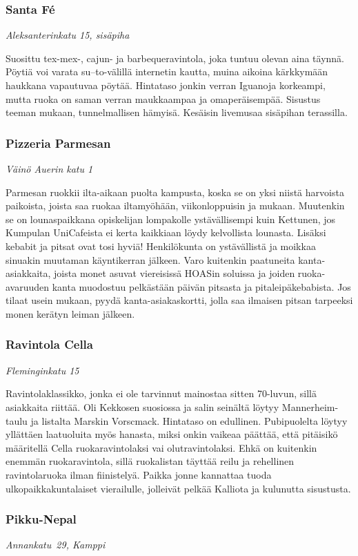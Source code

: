 \documentclass[../ala_hataile.tex]{subfiles}
\begin{document}
\subsubsection*{Santa Fé}
\textit{Aleksanterinkatu 15, sisäpiha}

Suosittu tex-mex-, cajun- ja barbequeravintola,
joka tuntuu olevan aina täynnä.
Pöytiä voi varata su--to-välillä internetin kautta, muina aikoina
kärkkymään haukkana vapautuvaa
pöytää. Hintataso jonkin verran Iguanoja
korkeampi, mutta ruoka on saman verran
maukkaampaa ja omaperäisempää.
Sisustus
teeman mukaan, tunnelmallisen
hämyisä.
Kesäisin livemusaa sisäpihan terassilla.
\subsubsection*{Pizzeria Parmesan}
\textit{Väinö Auerin katu 1}

Parmesan ruokkii ilta-aikaan puolta
kampusta, koska se on yksi niistä harvoista
paikoista, joista saa ruokaa iltamyöhään, viikonloppuisin ja mukaan. Muutenkin
se on lounaspaikkana opiskelijan lompakolle
ystävällisempi kuin Kettunen, jos
Kumpulan UniCafeista ei kerta kaikkiaan
löydy kelvollista lounasta. Lisäksi kebabit
ja pitsat ovat tosi hyviä! Henkilökunta on
ystävällistä
ja moikkaa sinuakin muutaman
käyntikerran jälkeen. Varo kuitenkin paatuneita
kanta-asiakkaita, joista monet asuvat
viereisissä HOASin soluissa ja joiden ruoka-
avaruuden kanta muodostuu pelkästään
päivän pitsasta ja pitaleipäkebabista. Jos
tilaat usein mukaan, pyydä kanta-asiakaskortti,
jolla saa ilmaisen pitsan tarpeeksi
monen kerätyn leiman jälkeen.


\subsubsection*{Ravintola Cella}
\textit{Fleminginkatu 15}

Ravintolaklassikko, jonka ei ole tarvinnut
mainostaa sitten 70-luvun, sillä
asiakkaita riittää. Oli Kekkosen suosiossa
ja salin seinältä löytyy Mannerheim-taulu
ja listalta Marskin Vorscmack. Hintataso
on edullinen. Pubipuolelta löytyy yllättäen
laatuoluita myös hanasta, miksi onkin
vaikeaa päättää, että pitäisikö määritellä
Cella ruokaravintolaksi vai olutravintolaksi.
Ehkä on kuitenkin enemmän ruokaravintola,
sillä ruokalistan täyttää reilu ja
rehellinen ravintolaruoka ilman fiinistelyä.
Paikka jonne kannattaa tuoda ulkopaikkakuntalaiset
vierailulle, jolleivät pelkää Kalliota
ja kulunutta sisustusta.
\subsubsection*{Pikku-Nepal}
\textit{Annankatu~29, Kamppi}
\end{document}
